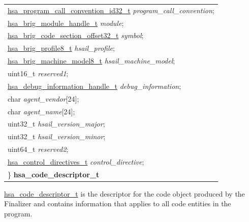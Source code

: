\documentclass[final]{book}
\newcommand{\reffld}[1]{\textit{#1}}
\begin{document}
\begin{appendices}
\begin{tcolorbox}[breakable,nobeforeafter,arc=0mm,colframe=white,colback=lightgray,left=0mm]
\begin{longtable}{@{}p{\textwidth}}
\hspace{1.7em}\hyperlink{group--FinalizerCoreApi-1ga8864426eb7d3278691632007c4eeebeb}{hsa_program_call_convention_id32_t} \reffld{program_call_convention};\\
\hspace{1.7em}\hyperlink{group--FinalizerCoreApi-1gafaea8b9ab368c499b58375f02f4b178b}{hsa_brig_module_handle_t} \reffld{module};\\
\hspace{1.7em}\hyperlink{group--FinalizerCoreApi-1ga975ce5cee53438ed8dc078f3e1dfbc04}{hsa_brig_code_section_offset32_t} \reffld{symbol};\\
\hspace{1.7em}\hyperlink{group--FinalizerCoreApi-1ga4c295feab0936078f4331549de995db6}{hsa_brig_profile8_t} \reffld{hsail_profile};\\
\hspace{1.7em}\hyperlink{group--FinalizerCoreApi-1ga01e2332dea5d847b0ef97d6a943965f0}{hsa_brig_machine_model8_t} \reffld{hsail_machine_model};\\
\hspace{1.7em}uint16_t \reffld{reserved1};\\
\hspace{1.7em}\hyperlink{group--FinalizerCoreApi-1ga94f1f72e9e58c7dca49026526fe95959}{hsa_debug_information_handle_t} \reffld{debug_information};\\
\hspace{1.7em}char \reffld{agent_vendor}[24];\\
\hspace{1.7em}char \reffld{agent_name}[24];\\
\hspace{1.7em}uint32_t \reffld{hsail_version_major};\\
\hspace{1.7em}uint32_t \reffld{hsail_version_minor};\\
\hspace{1.7em}uint64_t \reffld{reserved2};\\
\hspace{1.7em}\hyperlink{group--FinalizerCoreApi-1ga40030e03c0503b0f2c704f6cf6002add}{hsa_control_directives_t} \reffld{control_directive};\\
\}  \hypertarget{group--FinalizerCoreApi-1ga867c6b6dcaa193e321529590eb5df130}{\textbf{hsa_code_descriptor_t}}
\end{longtable}

\end{tcolorbox}
\hyperlink{group--FinalizerCoreApi-1ga867c6b6dcaa193e321529590eb5df130}{hsa_code_descriptor_t} is the descriptor for the code object produced by the Finalizer and contains information that applies to all code entities in the program.


\end{appendices}
\end{document}
